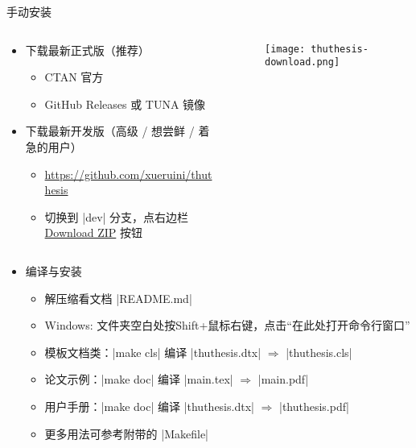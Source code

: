 \begin{frame}[fragile]{手动安装\ThuThesis{}}
      \begin{columns}
        \begin{column}{.7\textwidth}
  \begin{itemize}
    \item 下载最新正式版（推荐）
      \begin{itemize}
        \item CTAN 官方 
        \item GitHub Releases  或 TUNA 镜像 
      \end{itemize}
    \item 下载最新开发版（高级 / 想尝鲜 / 着急的用户）
      \begin{itemize}
        \item \url{https://github.com/xueruini/thuthesis}
        \item 切换到 |dev| 分支，点右边栏
          \href{https://github.com/xueruini/thuthesis/archive/dev.zip}%
          {Download ZIP} 按钮
      \end{itemize}
  \end{itemize}
        \end{column}
        \begin{column}{.3\textwidth}
          \begin{figure}[htbp]
            \centering
            \texttt{[image: thuthesis-download.png]}
          \end{figure}
        \end{column}
      \end{columns}
  \begin{itemize}
    \item 编译与安装
      \begin{itemize}
        \item 解压缩看文档 |README.md|
        \item Windows: 文件夹空白处按Shift+鼠标右键，点击``在此处打开命令行窗口''
        \item 模板文档类：|make cls| 编译 |thuthesis.dtx| $\Rightarrow$
          |thuthesis.cls|
        \item 论文示例：|make doc| 编译 |main.tex| $\Rightarrow$
        |main.pdf|
        \item 用户手册：|make doc| 编译 |thuthesis.dtx| $\Rightarrow$
          |thuthesis.pdf|
        \item 更多用法可参考附带的 |Makefile|
      \end{itemize}
  \end{itemize}
\end{frame}

